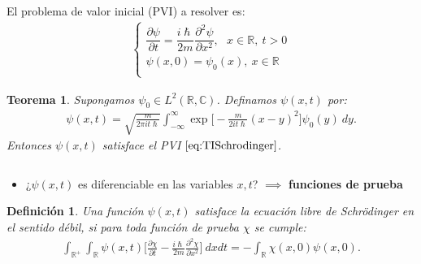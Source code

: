 \documentclass[aspectratio=1610]{beamer}
\newcommand*{\field}[1]{\mathbb{#1}}
\newtheorem*{teo}{Teorema}
\newtheorem*{defn}{Definición}
\begin{document}
\begin{frame}

El problema de valor inicial (PVI) a resolver es:
    \begin{align}
         \left\{ \begin{array}{ll}
         \dfrac{\partial\psi}{\partial t} = \dfrac{i\hslash}{2m}\dfrac{\partial^2\psi}{\partial x^2},\:\:\:x\in\field{R},\:t>0 \\
         \psi(x,0) = \psi_{0}(x),\:x\in\field{R} \\
         \end{array}
\right.
    \label{eq:TISchrodinger}
    \end{align}
 
\vspace{0.02\textheight} 
    
\begin{teo}
    Supongamos $\psi_{0} \in L^2(\field{R},\field{C})$. Definamos $\psi(x,t)$ por:
    \begin{align*}
        \psi(x,t) = \sqrt{\frac{m}{2\pi it\hslash}}\int_{-\infty}^{\infty}\exp\bigg[-\frac{m}{2it\hslash}(x-y)^2\bigg]\psi_{0}(y) \: dy.
    \end{align*}
    Entonces $\psi(x,t)$ satisface el PVI $\eqref{eq:TISchrodinger}$.
    \label{teo:Rev4}
\end{teo}

\begin{columns}
\column{37em}
\end{columns}
\end{frame}
\begin{frame}{}

\begin{itemize}\itemsep1em
  \justifying
  \item  \textcolor{Ocean}{¿$\psi(x,t)$ es diferenciable en las variables $x,t$? $\implies$ \textbf{funciones de prueba}} 
\end{itemize}

\vspace{0.1\textheight} 

\begin{defn}
        Una función $\psi(x,t)$ satisface la ecuación libre de Schrödinger en el sentido débil, si para toda función de prueba $\chi$ se cumple:
        \begin{align} \int_{\field{R}^+}\int_{\field{R}}\psi(x,t)\bigg[\frac{\partial\chi}{\partial t}-\frac{i\hslash}{2m}\frac{\partial ^2\chi}{\partial x^2}\bigg]\:dxdt = -\int_{\field{R}}\chi(x,0)\psi(x,0). \label{eq:Soldebil}
        \end{align}
        \label{lem:Rev5}
\end{defn}
    
\begin{columns}
\column{37em}
\end{columns}
\end{frame}
\end{document}
